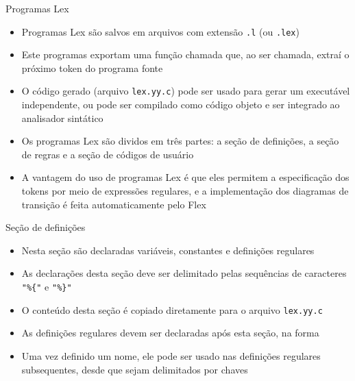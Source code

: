 \begin{frame}[fragile]{Programas Lex}

    \begin{itemize}
        \item Programas Lex são salvos em arquivos com extensão \texttt{.l} (ou \texttt{.lex})
        \pause

        \item Este programas exportam uma função chamada  que, ao ser chamada, extraí o próximo token do programa fonte
        \pause

        \item O código gerado (arquivo \texttt{lex.yy.c}) pode ser usado para gerar um executável independente, ou pode ser compilado como código objeto e ser
            integrado ao analisador sintático
        \pause

        \item Os programas Lex são dividos em três partes: a seção de definições, a seção de regras e a seção de códigos de usuário
        \pause

        \item A vantagem do uso de programas Lex é que eles permitem a especificação dos tokens por meio de expressões regulares, e a implementação dos
            diagramas de transição é feita automaticamente pelo Flex
    \end{itemize}

\end{frame}

\begin{frame}[fragile]{Seção de definições}

    \begin{itemize}
        \item Nesta seção são declaradas variáveis, constantes e definições regulares
        \pause

        \item As declarações desta seção deve ser delimitado pelas sequências de caracteres \verb|"%{"| 
            e \verb|"%}"|
        \pause

        \item O conteúdo desta seção é copiado diretamente para o arquivo \texttt{lex.yy.c}
        \pause

        \item As definições regulares devem ser declaradas após esta seção, na forma
        \pause

        \item Uma vez definido um nome, ele pode ser usado nas definições regulares subsequentes, desde que sejam delimitados por chaves
    \end{itemize}

\end{frame}

